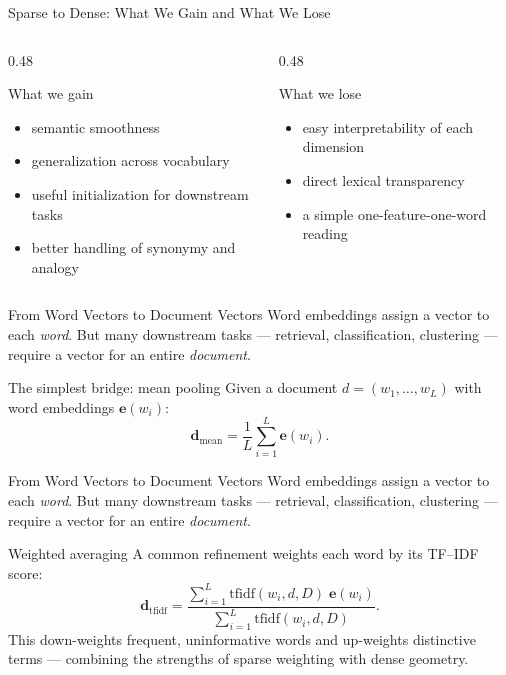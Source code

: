 \documentclass[aspectratio=169]{beamer}
\newcommand{\vect}[1]{\bm{#1}}
\begin{document}
\begin{frame}{Sparse to Dense: What We Gain and What We Lose}
\begin{columns}[T]
\begin{column}{0.48\textwidth}
\begin{block}{What we gain}
\begin{itemize}
    \item semantic smoothness
    \item generalization across vocabulary
    \item useful initialization for downstream tasks
    \item better handling of synonymy and analogy
\end{itemize}
\end{block}
\end{column}
\begin{column}{0.48\textwidth}
\begin{block}{What we lose}
\begin{itemize}
    \item easy interpretability of each dimension
    \item direct lexical transparency
    \item a simple one-feature-one-word reading
\end{itemize}
\end{block}
\end{column}
\end{columns}
\end{frame}
%
%
\begin{frame}{From Word Vectors to Document Vectors}
Word embeddings assign a vector to each \emph{word}. But many downstream tasks ---
retrieval, classification, clustering --- require a vector for an entire \emph{document}.

\vspace{0.15cm}
\begin{block}{The simplest bridge: mean pooling}
Given a document $d = (w_1,\dots,w_L)$ with word embeddings $\vect{e}(w_i)$:
\[
\vect{d}_{\text{mean}} = \frac{1}{L}\sum_{i=1}^{L}\vect{e}(w_i).
\]
\end{block}

\end{frame}
%
%
\begin{frame}{From Word Vectors to Document Vectors}
Word embeddings assign a vector to each \emph{word}. But many downstream tasks ---
retrieval, classification, clustering --- require a vector for an entire \emph{document}.

\vspace{0.15cm}
\begin{block}{Weighted averaging}
A common refinement weights each word by its TF--IDF score:
\[
\vect{d}_{\text{tfidf}} = \frac{\sum_{i=1}^{L} \mathrm{tfidf}(w_i,d,D)\;\vect{e}(w_i)}
{\sum_{i=1}^{L} \mathrm{tfidf}(w_i,d,D)}.
\]
This down-weights frequent, uninformative words and up-weights distinctive terms ---
combining the strengths of sparse weighting with dense geometry.
\end{block}
\end{frame}
\end{document}

